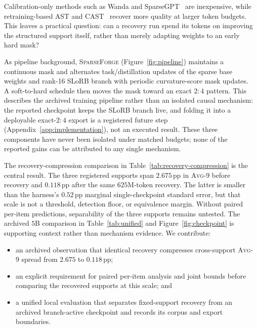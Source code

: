 \documentclass{article}
\newcommand{\method}{\textsc{SparseForge}}
\newcommand{\taskavg}{\textsc{Avg}-9}
\begin{document}
Calibration-only methods such as Wanda and SparseGPT~\citep{sun2023wanda,frantar2023sparsegpt} are inexpensive, while retraining-based AST and CAST~\citep{huang2025ast,huang2025cast} recover more quality at larger token budgets. This leaves a practical question: can a recovery run spend its tokens on improving the structured support itself, rather than merely adapting weights to an early hard mask?

As pipeline background, \method{} (Figure~\ref{fig:pipeline}) maintains a continuous mask and alternates task/distillation updates of the sparse base weights and rank-16 SLoRB branch with periodic curvature-score mask updates. A soft-to-hard schedule then moves the mask toward an exact $2{:}4$ pattern. This describes the archived training pipeline rather than an isolated causal mechanism: the reported checkpoint keeps the SLoRB branch live, and folding it into a deployable exact-$2{:}4$ export is a registered future step (Appendix~\ref{app:implementation}), not an executed result. These three components have never been isolated under matched budgets; none of the reported gains can be attributed to any single mechanism.

The recovery-compression comparison in Table~\ref{tab:recovery-compression} is the central result.
The three registered supports span $2.675$\,pp in \taskavg{} before recovery and $0.118$\,pp after
the same $625$M-token recovery. The latter is smaller than the harness's $0.52$\,pp marginal
single-checkpoint standard error, but that scale is not a threshold, detection floor, or equivalence
margin. Without paired per-item predictions, separability of the three supports remains untested.
The archived $5$B comparison in Table~\ref{tab:unified} and Figure~\ref{fig:checkpoint} is supporting
context rather than mechanism evidence. We contribute:
\begin{minipage}{\linewidth}
\begin{itemize}
  \item an archived observation that identical recovery compresses cross-support \taskavg{} spread
  from $2.675$ to $0.118$\,pp;
  \item an explicit requirement for paired per-item analysis and joint bounds before comparing the
  recovered supports at this scale; and
  \item a unified local evaluation that separates fixed-support recovery from an archived
  branch-active checkpoint and records its corpus and export boundaries.
\end{itemize}
\end{minipage}
\end{document}

